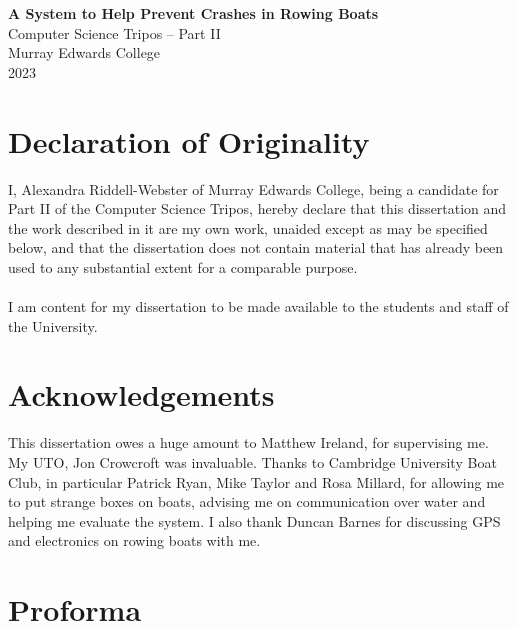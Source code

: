 \documentclass[12pt,a4paper]{report}
\begin{document}
\thispagestyle{empty}


\vspace*{60mm}
\begin{center}
\Huge
\textbf{A System to Help Prevent Crashes in Rowing Boats} \\[5mm]
Computer Science Tripos -- Part II \\[5mm]
Murray Edwards College \\[5mm]
2023
\end{center}

\pagestyle{plain}
\chapter*{Declaration of Originality}

I, Alexandra Riddell-Webster of Murray Edwards College, being a candidate for Part II of the Computer Science Tripos, hereby declare that this dissertation and the work described in it are my own work, unaided except as may be specified below, and that the dissertation does not contain material that has already been used to any substantial extent for a comparable purpose. \\ \\
I am content for my dissertation to be made available to the students and staff of the University. \\

\bigskip

\chapter*{Acknowledgements}
This dissertation owes a huge amount to Matthew Ireland, for supervising me. My UTO, Jon Crowcroft was invaluable. Thanks to Cambridge University Boat Club, in particular Patrick Ryan, Mike Taylor and Rosa Millard, for allowing me to put strange boxes on boats, advising me on communication over water and helping me evaluate the system. I also thank Duncan Barnes for discussing GPS and electronics on rowing boats with me.



\chapter*{Proforma}
\end{document}
